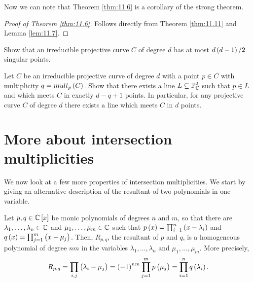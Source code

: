 Now we can note that Theorem \ref{thm:11.6} is a corollary of the strong theorem.

\begin{proof}[Proof of Theorem \ref{thm:11.6}]
Follows directly from Theorem \ref{thm:11.11} and Lemma \ref{lem:11.7}.
\end{proof}

\begin{exercise}
Show that an irreducible projective curve $ C $ of degree $ d $ has at most $ d\br{d - 1} / 2 $ singular points.
\end{exercise}

\begin{exercise}
Let $ C $ be an irreducible projective curve of degree $ d $ with a point $ p \in C $ with multiplicity $ q = mult_p\br{C} $. Show that there exists a line $ L \subseteq \mathbb{P}_{\mathbb{C}}^2 $ such that $ p \in L $ and which meets $ C $ in exactly $ d - q + 1 $ points. In particular, for any projective curve $ C $ of degree $ d $ there exists a line which meets $ C $ in $ d $ points.
\end{exercise}

\pagebreak

\section{More about intersection multiplicities}

We now look at a few more properties of intersection multiplicities. We start by giving an alternative description of the resultant of two polynomials in one variable.

\begin{lemma}
\label{lem:12.1}
Let $ p, q \in \C\sbr{x} $ be monic polynomials of degrees $ n $ and $ m $, so that there are $ \lambda_1, \dots, \lambda_n \in \mathbb{C} $ and $ \mu_1, \dots, \mu_m \in \mathbb{C} $ such that $ p\br{x} = \prod_{i = 1}^n \br{x - \lambda_i} $ and $ q\br{x} = \prod_{j = 1}^m \br{x - \mu_j} $. Then, $ R_{p, q} $, the resultant of $ p $ and $ q $, is a homogeneous polynomial of degree $ nm $ in the variables $ \lambda_1, \dots, \lambda_n $ and $ \mu_1, \dots, \mu_m $. More precisely,
$$ R_{p, q} = \prod_{i, j}\br{\lambda_i - \mu_j} = \br{-1}^{nm}\prod_{j = 1}^m p\br{\mu_j} = \prod_{i = 1}^n q\br{\lambda_i}. $$
\end{lemma}

